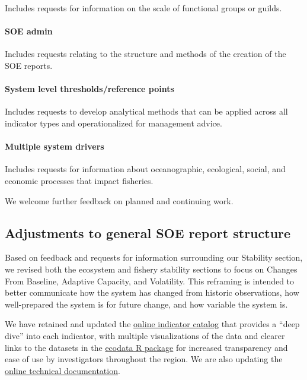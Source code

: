 \documentclass[
  10pt,
]{article}
\begin{document}
Includes requests for information on the scale of functional groups or
guilds.

\paragraph{SOE admin}\label{soe-admin}

Includes requests relating to the structure and methods of the creation
of the SOE reports.

\paragraph{System level thresholds/reference
points}\label{system-level-thresholdsreference-points}

Includes requests to develop analytical methods that can be applied
across all indicator types and operationalized for management advice.

\paragraph{Multiple system drivers}\label{multiple-system-drivers}

Includes requests for information about oceanographic, ecological,
social, and economic processes that impact fisheries.

We welcome further feedback on planned and continuing work.

\subsection{Adjustments to general SOE report
structure}\label{adjustments-to-general-soe-report-structure}

Based on feedback and requests for information surrounding our Stability
section, we revised both the ecosystem and fishery stability sections to
focus on Changes From Baseline, Adaptive Capacity, and Volatility. This
reframing is intended to better communicate how the system has changed
from historic observations, how well-prepared the system is for future
change, and how variable the system is.

We have retained and updated the
\href{https://noaa-edab.github.io/catalog/index.html}{online indicator
catalog} that provides a ``deep dive'' into each indicator, with
multiple visualizations of the data and clearer links to the datasets in
the \href{https://noaa-edab.github.io/ecodata/}{ecodata R package} for
increased transparency and ease of use by investigators throughout the
region. We are also updating the
\href{https://noaa-edab.github.io/tech-doc/}{online technical
documentation}.
\end{document}
